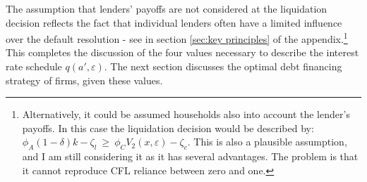 \documentclass[12pt]{article}
\begin{document}
The assumption that lenders' payoffs are not considered at the liquidation decision reflects the fact that individual lenders often have a limited influence over the default resolution - see in section \ref{sec:key principles} of the appendix.\footnote{Alternatively, it could be assumed households also into account the lender's payoffs. In this case the liquidation decision would be described by: $\phi_A (1-\delta) k - \zeta_l  \  \geq \ \phi_C V_2(x,\varepsilon)- \zeta_c$. This is also a plausible assumption, and I am still considering it as it has several advantages. The problem is that it cannot reproduce CFL reliance between zero and one.} \vspace{3mm} \\
This completes the discussion of the four values necessary to describe the interest rate schedule $q(a', \varepsilon)$. The next section discusses the optimal debt financing strategy of firms, given these values. 
\end{document}
